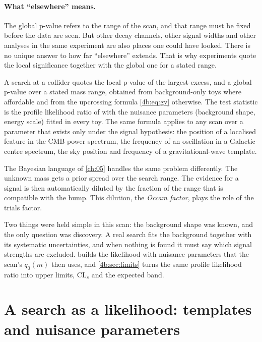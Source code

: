 \paragraph{What ``elsewhere'' means.}
The global p-value refers to the range of the scan, and that range must be
fixed before the data are seen. But other decay channels, other signal widths
and other analyses in the same experiment are also places one could have
looked. There is no unique answer to how far ``elsewhere'' extends. That is why
experiments quote the local significance together with the global one for a
stated range.

\begin{inpractice}
A search at a collider quotes the local p-value of the largest excess, and a
global p-value over a stated mass range, obtained from background-only toys
where affordable and from the upcrossing formula \eqref{4b:eq:gv} otherwise. The
test statistic is the profile likelihood ratio of \cite{Cowan2011} with the
nuisance parameters (background shape, energy scale) fitted in every toy. The
same formula applies to any scan over a parameter that exists only under the
signal hypothesis: the position of a localised feature in the CMB power
spectrum, the frequency of an oscillation in a Galactic-centre spectrum, the
sky position and frequency of a gravitational-wave template.
\end{inpractice}

The Bayesian language of \cref{ch:05} handles the same problem differently.
The unknown mass gets a prior spread over the search range. The evidence for a
signal is then automatically diluted by the fraction of the range that is
compatible with the bump. This dilution, the \emph{Occam factor}, plays the
role of the trials factor.

Two things were held simple in this scan: the background shape was known, and
the only question was discovery. A real search fits the background together
with its systematic uncertainties, and when nothing is found it must say which
signal strengths are excluded.  builds the likelihood
with nuisance parameters that the scan's $q_0(m)$ then uses, and
\cref{4b:sec:limits} turns the same profile likelihood ratio into upper limits,
$\mathrm{CL}_s$ and the expected band.
\section{A search as a likelihood: templates and nuisance parameters}
\label{4b:sec:templates}

